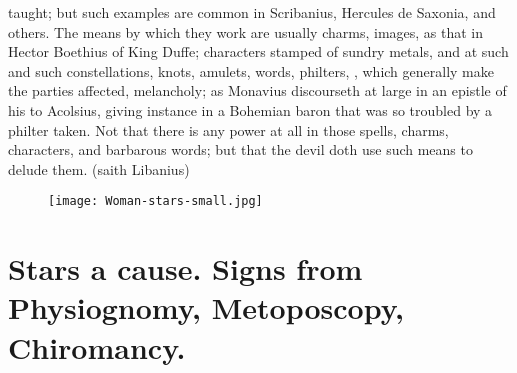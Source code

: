 {{taught; but such examples are common in Scribanius, Hercules de
Saxonia, and others. The means by which they work are usually charms,
images, as that in Hector Boethius of King Duffe; characters stamped of
sundry metals, and at such and such constellations, knots, amulets,
words, philters, \etc{}, which generally make the parties affected,
melancholy; as Monavius discourseth at large in an epistle of his
to Acolsius, giving instance in a Bohemian baron that was so troubled
by a philter taken. Not that there is any power at all in those spells,
charms, characters, and barbarous words; but that the devil doth use
such means to delude them.  (saith Libanius)

\cleartoleftpage{}
\begin{figure}[p]
  \begingroup
  \centering
  \texttt{[image: Woman-stars-small.jpg]}
  \label{fig:womanstars}
\end{figure}

\clearpage{}
\thispagestyle{titleontop}

\section[Heavens, Planets, Stars]{Stars a cause. Signs from Physiognomy, Metoposcopy, Chiromancy.}\label{sec:heavens-planets-stars}

}}
